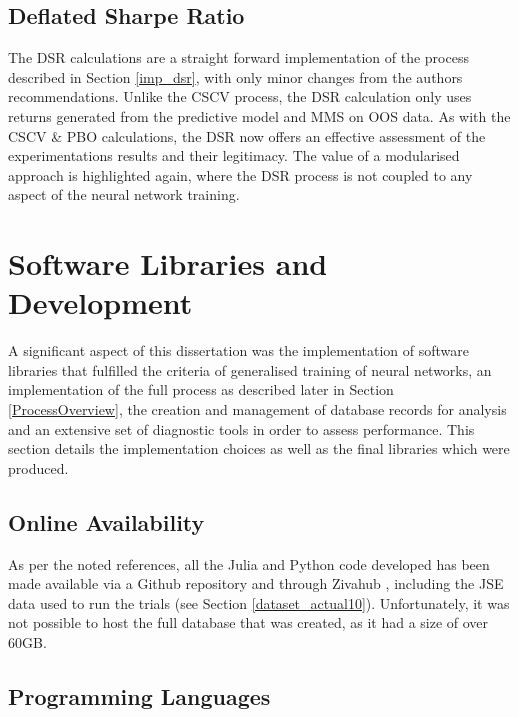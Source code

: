 \documentclass[a4paper,11pt,oneside]{article}
\theoremstyle{plain}
\theoremstyle{definition}
\begin{document}
	\subsection{Deflated Sharpe Ratio}\label{proc_dsr}
	
	The DSR calculations are a straight forward implementation of the process described in Section \ref{imp_dsr}, with only minor changes from the authors recommendations. Unlike the CSCV process, the DSR calculation only uses returns generated from the predictive model and MMS on OOS data. As with the CSCV \& PBO calculations, the DSR now offers an effective assessment of the experimentations results and their legitimacy. The value of a modularised approach is highlighted again, where the DSR process is not coupled to any aspect of the neural network training.
	
	
	
	
	
	
	
	
	
	
	
	
	
		\newpage
	\section{Software Libraries and Development}\label{Software}
	
	A significant aspect of this dissertation was the implementation of software libraries that fulfilled the criteria of generalised training of neural networks, an implementation of the full process as described later in Section \ref{ProcessOverview}, the creation and management of database records for analysis and an extensive set of diagnostic tools in order to assess performance. This section details the implementation choices as well as the final libraries which were produced.
	
	\subsection{Online Availability}
	
	As per the noted references, all the Julia and Python code developed has been made available via a Github repository and through Zivahub \citep{DCCodeBase}, including the JSE data used to run the trials (see Section \ref{dataset_actual10}). Unfortunately, it was not possible to host the full database that was created, as it had a size of over 60GB.
	
	
	\subsection{Programming Languages}
	
\end{document}
